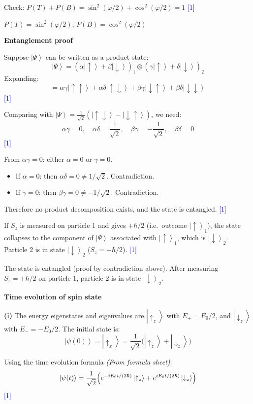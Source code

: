 \documentclass[12pt,a4paper]{article}
\newcommand{\markstep}[1]{\hfill\textcolor{blue}{[#1]}}
\newcommand{\finalanswer}[1]{%
  \begin{tcolorbox}[colback=green!5!white,colframe=green!50!black,boxrule=0.5pt]
  #1
  \end{tcolorbox}
}
\newcommand{\fromsheet}{\textit{(From formula sheet)}}
\renewcommand{\ket}[1]{\left|#1\right\rangle}
\begin{document}
\begin{parts}
Check: $P(T) + P(B) = \sin^2(\varphi/2) + \cos^2(\varphi/2) = 1$ \checkmark \markstep{1}

\finalanswer{$P(T) = \sin^2(\varphi/2)$, \quad $P(B) = \cos^2(\varphi/2)$}

\item \textbf{Entanglement proof} 

Suppose $\ket{\Psi}$ can be written as a product state:
\[
\ket{\Psi} = (\alpha\ket{\uparrow} + \beta\ket{\downarrow})_1 \otimes (\gamma\ket{\uparrow} + \delta\ket{\downarrow})_2
\]
Expanding:
\[
= \alpha\gamma\ket{\uparrow\uparrow} + \alpha\delta\ket{\uparrow\downarrow} + \beta\gamma\ket{\downarrow\uparrow} + \beta\delta\ket{\downarrow\downarrow}
\]
\markstep{1}

Comparing with $\ket{\Psi} = \frac{1}{\sqrt{2}}(\ket{\uparrow\downarrow} - \ket{\downarrow\uparrow})$, we need:
\[
\alpha\gamma = 0, \quad \alpha\delta = \frac{1}{\sqrt{2}}, \quad \beta\gamma = -\frac{1}{\sqrt{2}}, \quad \beta\delta = 0
\]
\markstep{1}

From $\alpha\gamma = 0$: either $\alpha = 0$ or $\gamma = 0$.
\begin{itemize}
\item If $\alpha = 0$: then $\alpha\delta = 0 \neq 1/\sqrt{2}$. Contradiction.
\item If $\gamma = 0$: then $\beta\gamma = 0 \neq -1/\sqrt{2}$. Contradiction.
\end{itemize}
Therefore no product decomposition exists, and the state is entangled. \markstep{1}

If $S_z$ is measured on particle 1 and gives $+\hbar/2$ (i.e.\ outcome $\ket{\uparrow}_1$), the state collapses to the component of $\ket{\Psi}$ associated with $\ket{\uparrow}_1$, which is $\ket{\downarrow}_2$. Particle 2 is in state $\ket{\downarrow}_2$ ($S_z = -\hbar/2$). \markstep{1}

\finalanswer{The state is entangled (proof by contradiction above). After measuring $S_z = +\hbar/2$ on particle 1, particle 2 is in state $\ket{\downarrow}_2$.}

\item \textbf{Time evolution of spin state} 

\textbf{(i)} The energy eigenstates and eigenvalues are $\ket{\uparrow_z}$ with $E_+ = E_0/2$, and $\ket{\downarrow_z}$ with $E_- = -E_0/2$. The initial state is:
\[
\ket{\psi(0)} = \ket{\uparrow_x} = \frac{1}{\sqrt{2}}\bigl(\ket{\uparrow_z} + \ket{\downarrow_z}\bigr)
\]

Using the time evolution formula \fromsheet:
\[
\ket{\psi(t)} = \frac{1}{\sqrt{2}}\Bigl(e^{-iE_0 t/(2\hbar)}\ket{\uparrow_z} + e^{iE_0 t/(2\hbar)}\ket{\downarrow_z}\Bigr)
\]
\markstep{1}


\end{parts}
\end{document}
